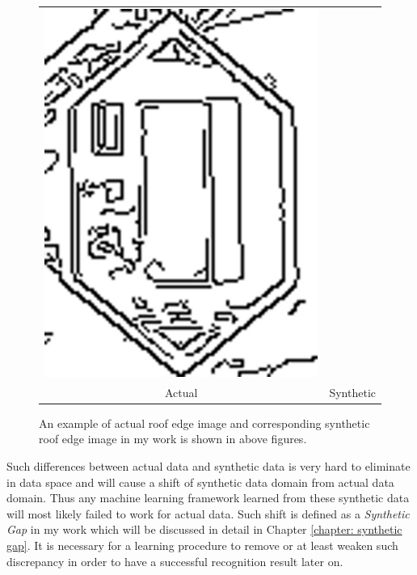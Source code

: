 \documentclass{iitthesis}
\begin{document}
\begin{figure}[htb]
{\begin{tabular}{cc}
{{  \includegraphics{Pic/PDF/ChamferMatching/buildingEdgeImage.pdf}}}
  \\
  Actual & Synthetic
\end{tabular}}
\caption{An example of actual roof edge image and corresponding synthetic roof edge image in my work \cite{ZX14} is shown in above figures.}
\label{fig: realandsynthetic}
\end{figure} 

Such differences between actual data and synthetic data is very hard to eliminate in data space and will cause a shift of synthetic data domain from actual data domain. Thus any machine learning framework learned from these synthetic data will most likely failed to work for actual data. Such shift is defined as a \textit{Synthetic Gap} in my work \cite{Zhang2014Autoencoder} which will be discussed in detail in Chapter \ref{chapter: synthetic gap}. It is necessary for a learning procedure to remove or at least weaken such discrepancy in order to have a successful recognition result later on.
\end{document}
